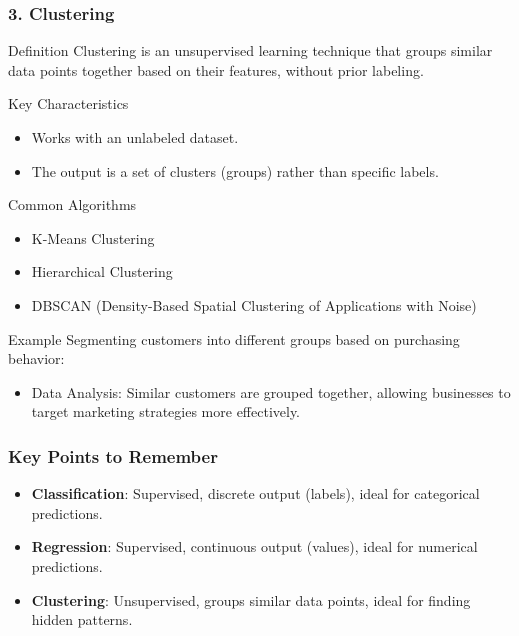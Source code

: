 \documentclass[aspectratio=169]{beamer}
\begin{document}
\begin{frame}[fragile]
    \frametitle{3. Clustering}
    \begin{block}{Definition}
        Clustering is an unsupervised learning technique that groups similar data points together based on their features, without prior labeling.
    \end{block}

    \begin{block}{Key Characteristics}
        \begin{itemize}
            \item Works with an unlabeled dataset.
            \item The output is a set of clusters (groups) rather than specific labels.
        \end{itemize}
    \end{block}

    \begin{block}{Common Algorithms}
        \begin{itemize}
            \item K-Means Clustering
            \item Hierarchical Clustering
            \item DBSCAN (Density-Based Spatial Clustering of Applications with Noise)
        \end{itemize}
    \end{block}

    \begin{block}{Example}
        Segmenting customers into different groups based on purchasing behavior:
        \begin{itemize}
            \item Data Analysis: Similar customers are grouped together, allowing businesses to target marketing strategies more effectively.
        \end{itemize}
    \end{block}
\end{frame}

\begin{frame}[fragile]
    \frametitle{Key Points to Remember}
    \begin{itemize}
        \item \textbf{Classification}: Supervised, discrete output (labels), ideal for categorical predictions.
        \item \textbf{Regression}: Supervised, continuous output (values), ideal for numerical predictions.
        \item \textbf{Clustering}: Unsupervised, groups similar data points, ideal for finding hidden patterns.
    \end{itemize}
\end{frame}
\end{document}
